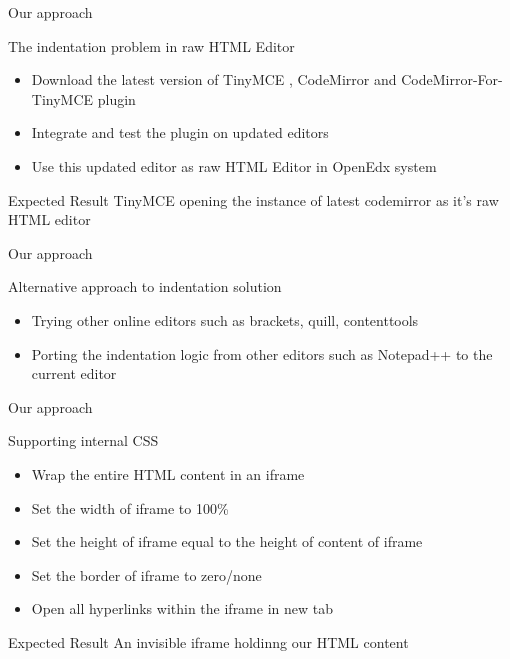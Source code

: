 \documentclass{beamer}
\begin{document}
	\begin{frame}{Our approach }
		\begin{block}{The indentation problem in raw HTML Editor }
			\begin{itemize}
				\item Download the latest version of TinyMCE , CodeMirror and CodeMirror-For-TinyMCE plugin
				\item Integrate and test the plugin on updated editors
				\item Use this updated editor as raw HTML Editor in OpenEdx system
			\end{itemize}
		\end{block}
		\begin{block}{Expected Result }
			TinyMCE opening the instance of latest codemirror as it's raw HTML editor
		\end{block}
	\end{frame}
	
	\begin{frame}{Our approach }
		\begin{block}{Alternative approach to indentation solution }
			\begin{itemize}
				\item Trying other online editors such as brackets, quill, contenttools
				\item Porting the indentation logic from other editors such as Notepad++ to the current editor
			\end{itemize}
		\end{block}
	\end{frame}
	
	\begin{frame}{Our approach }
		\begin{block}{Supporting internal CSS }
			\begin{itemize}
				\item Wrap the entire HTML content in an iframe
				\item Set the width of iframe to 100\%
				\item Set the height of iframe equal to the height of content of iframe
				\item Set the border of iframe to zero/none
				\item Open all hyperlinks within the iframe in new tab
			\end{itemize}
		\end{block}
		\begin{block}{Expected Result}
			An invisible iframe holdinng our HTML content
		\end{block}
	\end{frame}
	
\end{document}

